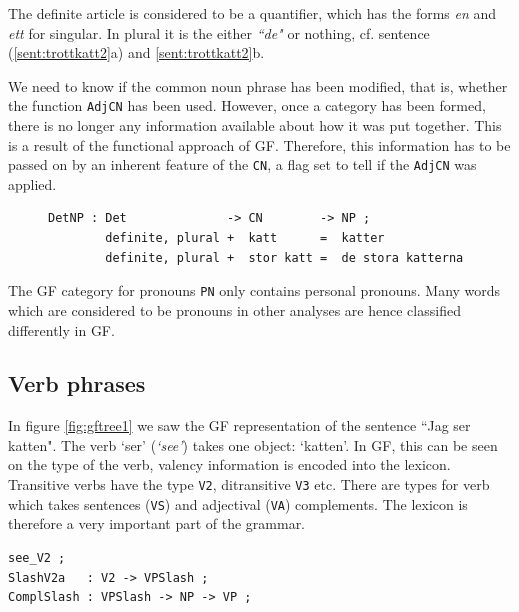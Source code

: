 \documentclass{report}
\begin{document}
The definite article is considered to be a quantifier, which has the forms
\emph{en} and \emph{ett} for singular. In plural it
is the either \emph{``de"} or nothing, cf. sentence (\ref{sent:trottkatt2}a) and
\ref{sent:trottkatt2}b.
\label{sent:trottkatt2}

We need to know if the common noun phrase 
has been modified, that is, whether the function \verb_AdjCN_ has been used.
However, once a category has been formed, there is no longer any information available
about how it was put together. This is a result of the functional approach
of GF. Therefore, %
this information
has to be passed on by an inherent feature of the \verb-CN-, a flag set to tell
if the \verb-AdjCN- was applied.
\begin{figure}[h]
\begin{verbatim}
DetNP : Det              -> CN        -> NP ;
        definite, plural +  katt      =  katter
        definite, plural +  stor katt =  de stora katterna
\end{verbatim}        
\caption{}\label{gfcode:defmod}
\end{figure}


The GF category for pronouns \verb-PN- only contains personal pronouns.
Many words which are considered to be pronouns in other analyses are hence
classified differently in GF.





\subsection{Verb phrases}
In figure \ref{fig:gftree1} we saw the GF representation of the sentence ``Jag
ser katten". The verb `ser' (\emph{`see'}) takes one object: `katten'.
In GF, this can be seen on the type of the verb,
valency information
is encoded into the lexicon. Transitive verbs have the type \verb-V2-, ditransitive
\verb-V3- etc. There are types for verb which takes sentences (\verb-VS-) and
adjectival (\verb-VA-) complements.
The lexicon is therefore a very important part of the
grammar. 
\begin{verbatim}
see_V2 ; 
SlashV2a   : V2 -> VPSlash ;
ComplSlash : VPSlash -> NP -> VP ;
\end{verbatim}
\end{document}
